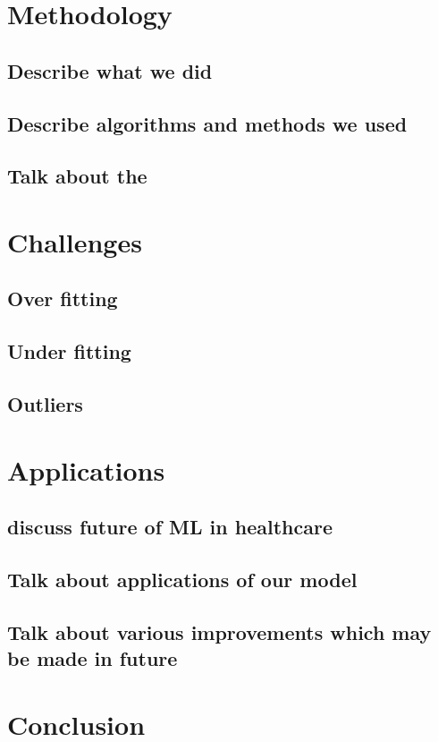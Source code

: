 \documentclass[conference]{IEEEtran}
\begin{document}
\section{Methodology}
\subsection{Describe what we did}
\subsection{Describe algorithms and methods we used}
\subsection{Talk about the }
\section{Challenges}
\subsection{Over fitting}
\subsection{Under fitting}
\subsection{Outliers}
\section{Applications}
\subsection{discuss future of ML in healthcare}
\subsection{Talk about applications of our model}
\subsection{Talk about various improvements which may be made in future}
\section{Conclusion}
\newpage
\clearpage
\printbibliography
\end{document}
